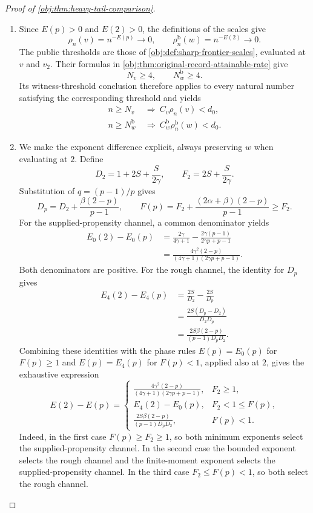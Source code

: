 \documentclass[11pt]{article}
\begin{document}
\begin{proof}[Proof of \cref{obj:thm:heavy-tail-comparison}]
\begin{enumerate}
\item Since \(E(p)>0\) and \(E(2)>0\), the definitions of the scales give
\[
\rho_n(v)=n^{-E(p)}\longrightarrow0,
\qquad
\rho_n^{\mathrm b}(w)=n^{-E(2)}\longrightarrow0.
\]
The public thresholds are those of \cref{obj:def:sharp-frontier-scales}, evaluated at \(v\) and \(v_2\). Their formulas in \cref{obj:thm:original-record-attainable-rate} give
\[
N_v\ge4,\qquad N_w^{\mathrm b}\ge4.
\]
Its witness-threshold conclusion therefore applies to every natural number satisfying the corresponding threshold and yields
\[
\begin{aligned}
n\ge N_v&\ \Longrightarrow\ C_v\rho_n(v)<d_0,\\
n\ge N_w^{\mathrm b}&\ \Longrightarrow\
C_w^{\mathrm b}\rho_n^{\mathrm b}(w)<d_0.
\end{aligned}
\]

\item We make the exponent difference explicit, always preserving \(w\) when evaluating at \(2\). Define
\[
D_2=1+2S+\frac{S}{2\gamma},
\qquad
F_2=2S+\frac{S}{2\gamma}.
\]
Substitution of \(q=(p-1)/p\) gives
\[
D_p=D_2+\frac{\beta(2-p)}{p-1},
\qquad
F(p)=F_2+\frac{(2\alpha+\beta)(2-p)}{p-1}
\ge F_2.
\]
For the supplied-propensity channel, a common denominator yields
\[
\begin{aligned}
E_0(2)-E_0(p)
&=\frac{2\gamma}{4\gamma+1}
 -\frac{2\gamma(p-1)}{2\gamma p+p-1}\\
&=\frac{4\gamma^2(2-p)}
 {(4\gamma+1)(2\gamma p+p-1)}.
\end{aligned}
\]
Both denominators are positive. For the rough channel, the identity for \(D_p\) gives
\[
\begin{aligned}
E_4(2)-E_4(p)
&=\frac{2S}{D_2}-\frac{2S}{D_p}\\
&=\frac{2S(D_p-D_2)}{D_2D_p}\\
&=\frac{2S\beta(2-p)}{(p-1)D_pD_2}.
\end{aligned}
\]
Combining these identities with the phase rules \(E(p)=E_0(p)\) for \(F(p)\ge1\) and \(E(p)=E_4(p)\) for \(F(p)<1\), applied also at \(2\), gives the exhaustive expression
\[
E(2)-E(p)=
\begin{cases}
\displaystyle
\frac{4\gamma^2(2-p)}
 {(4\gamma+1)(2\gamma p+p-1)},
&F_2\ge1,\\[6pt]
\displaystyle
E_4(2)-E_0(p),
&F_2<1\le F(p),\\[4pt]
\displaystyle
\frac{2S\beta(2-p)}{(p-1)D_pD_2},
&F(p)<1.
\end{cases}
\]
Indeed, in the first case \(F(p)\ge F_2\ge1\), so both minimum exponents select the supplied-propensity channel. In the second case the bounded exponent selects the rough channel and the finite-moment exponent selects the supplied-propensity channel. In the third case \(F_2\le F(p)<1\), so both select the rough channel.


\end{enumerate}
\end{proof}
\end{document}
